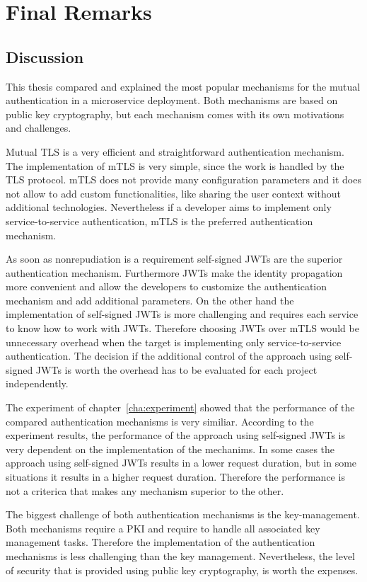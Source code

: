\chapter{Final Remarks}
\label{cha:final_remarks}

\section{Discussion}
This thesis compared and explained the most popular mechanisms for the mutual authentication in a microservice deployment.
Both mechanisms are based on public key cryptography, but each mechanism comes with its own motivations and challenges.

Mutual TLS is a very efficient and straightforward authentication mechanism.
The implementation of mTLS is very simple, since the work is handled by the TLS protocol.
mTLS does not provide many configuration parameters and it does not allow to add custom functionalities, like sharing the user context without additional technologies.
Nevertheless if a developer aims to implement only service-to-service authentication, mTLS is the preferred authentication mechanism.

As soon as nonrepudiation is a requirement self-signed JWTs are the superior authentication mechanism.
Furthermore JWTs make the identity propagation more convenient and allow the developers to customize the authentication mechanism and add additional parameters.
On the other hand the implementation of self-signed JWTs is more challenging and requires each service to know how to work with JWTs.
Therefore choosing JWTs over mTLS would be unnecessary overhead when the target is implementing only service-to-service authentication.
The decision if the additional control of the approach using self-signed JWTs is worth the overhead has to be evaluated for each project independently.

The experiment of chapter~\ref{cha:experiment} showed that the performance of the compared authentication mechanisms is very similiar.
According to the experiment results, the performance of the approach using self-signed JWTs is very dependent on the implementation of the mechanims.
In some cases the approach using self-signed JWTs results in a lower request duration, but in some situations it results in a higher request duration.
Therefore the performance is not a criterica that makes any mechanism superior to the other.

The biggest challenge of both authentication mechanisms is the key-management.
Both mechanisms require a PKI and require to handle all associated key management tasks.
Therefore the implementation of the authentication mechanisms is less challenging than the key management.
Nevertheless, the level of security that is provided using public key cryptography, is worth the expenses.

